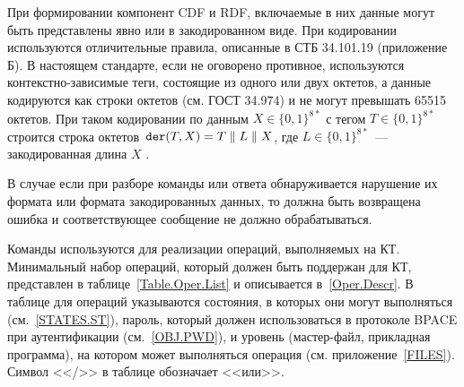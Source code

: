 При формировании компонент CDF и RDF, включаемые в них данные могут быть 
представлены явно или в закодированном виде. При кодировании используются 
отличительные правила, описанные в СТБ 34.101.19 (приложение Б). В 
настоящем стандарте, если не оговорено противное, используются 
контекстно-зависимые теги, состоящие из одного или двух октетов, а данные 
кодируются как строки октетов (см. ГОСТ 34.974) и не могут превышать 65515 
октетов. При таком кодировании по данным $X\in\{0,1\}^{8*}$ 
с тегом $T\in\{0,1\}^{8*}$ строится строка 
октетов~$\texttt{der}(T, X) = T \parallel L \parallel X$, 
где $L\in\{0,1\}^{8*}$~--- 
закодированная длина $X$ . 

В случае если при разборе команды или ответа обнаруживается нарушение их 
формата или формата закодированных данных, то должна быть возвращена 
ошибка и соответствующее сообщение не должно обрабатываться. 

Команды используются для реализации операций, выполняемых на КТ.
Минимальный набор операций, который должен быть поддержан для КТ,
представлен в таблице~\ref{Table.Oper.List} и описывается
в~\ref{Oper.Descr}. 
В таблице для операций указываются состояния, 
в которых они могут выполняться (см.~\ref{STATES.ST}),
пароль, который должен использоваться 
в протоколе BPACE при аутентификации (см.~\ref{OBJ.PWD}), 
и уровень (мастер-файл, прикладная программа), 
на котором может выполняться операция 
(см. приложение~\ref{FILES}).
Символ <</>> в таблице обозначает <<или>>.


